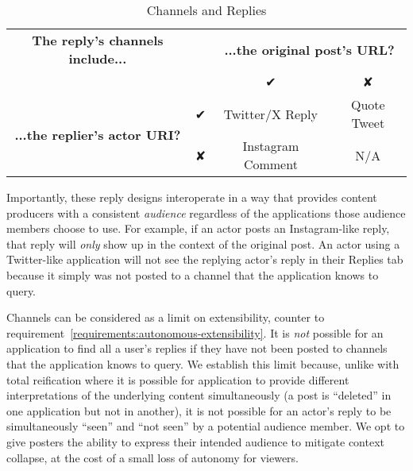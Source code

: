 \begin{table}[htbp]
    \label{concepts:channel-replies}
    \caption{Channels and Replies}
    \begin{tabular}{c|c|c|c}
        \textbf{The reply's channels include...} & & \multicolumn{2}{c}{\textbf{...the original post's URL?}} \\
        & & ✔︎ & ✘ \\
        \multirow{2}{*}{\textbf{...the replier's actor URI?}} & ✔︎ & Twitter/X Reply & Quote Tweet \\
        & ✘ & Instagram Comment & N/A \\
    \end{tabular}
\end{table}

Importantly, these reply designs interoperate in a way that provides content producers with
a consistent \emph{audience} regardless of the applications those audience members choose to use.
For example, if an actor posts an Instagram-like reply, that reply will \emph{only} show up
in the context of the original post. An actor using a Twitter-like application
will not see the replying actor's reply in their Replies tab because it simply was not
posted to a channel that the application knows to query.

Channels can be considered as a limit on extensibility, counter to requirement~\ref{requirements:autonomous-extensibility}.
It is \emph{not} possible for an
application to find all a user's replies if they have not been posted to channels that
the application knows to query.
We establish this limit because, unlike with total reification where it is
possible for application to provide different interpretations of the underlying
content simultaneously (a post is ``deleted'' in one application but not in another),
it is not possible for an actor's reply to be simultaneously ``seen'' and ``not seen''
by a potential audience member.
We opt to give posters the ability to express their intended audience
to mitigate context collapse, at the cost of a small loss of autonomy for viewers.




